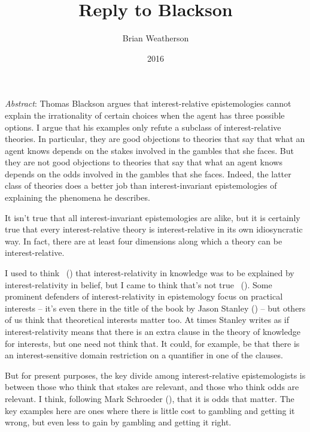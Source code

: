 \documentclass[
  11pt,
  letterpaper,
  DIV=11,
  numbers=noendperiod,
  twoside]{scrartcl}
\title{Reply to Blackson}
\author{Brian Weatherson}
\date{2016}
\renewenvironment{abstract}
 {\vspace{-1.25cm}
 \quotation\small\noindent\emph{Abstract}:}
 {\endquotation}
\renewenvironment{abstract}
 {\quotation\small\noindent\emph{Abstract}:}
 {\endquotation\vspace{-0.02cm}}
\begin{document}
\maketitle
\begin{abstract}
Thomas Blackson argues that interest-relative epistemologies cannot
explain the irrationality of certain choices when the agent has three
possible options. I argue that his examples only refute a subclass of
interest-relative theories. In particular, they are good objections to
theories that say that what an agent knows depends on the stakes
involved in the gambles that she faces. But they are not good objections
to theories that say that what an agent knows depends on the odds
involved in the gambles that she faces. Indeed, the latter class of
theories does a better job than interest-invariant epistemologies of
explaining the phenomena he describes.
\end{abstract}


It isn't true that all interest-invariant epistemologies are alike, but
it is certainly true that every interest-relative theory is
interest-relative in its own idiosyncratic way. In fact, there are at
least four dimensions along which a theory can be interest-relative.

I used to think ~()
that interest-relativity in knowledge was to be explained by
interest-relativity in belief, but I came to think that's not true
~(). Some prominent
defenders of interest-relativity in epistemology focus on practical
interests -- it's even there in the title of the book by Jason Stanley
() -- but others of us think that
theoretical interests matter too. At times Stanley writes as if
interest-relativity means that there is an extra clause in the theory of
knowledge for interests, but one need not think that. It could, for
example, be that there is an interest-sensitive domain restriction on a
quantifier in one of the clauses.

But for present purposes, the key divide among interest-relative
epistemologists is between those who think that stakes are relevant, and
those who think odds are relevant. I think, following Mark Schroeder
(), that it is odds that matter. The
key examples here are ones where there is little cost to gambling and
getting it wrong, but even less to gain by gambling and getting it
right.
\end{document}
